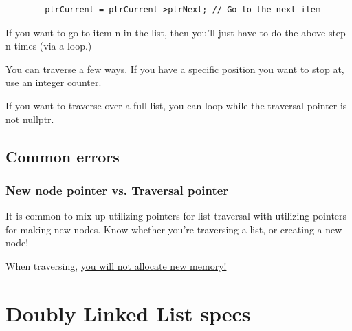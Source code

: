 \documentclass[a4paper,12pt,onepage]{book}
\begin{document}
    \begin{verbatim} 
        ptrCurrent = ptrCurrent->ptrNext; // Go to the next item
    \end{verbatim} 
        
        If you want to go to item n in the list, then you'll just have to do the above step n times (via a loop.)

        You can traverse a few ways. If you have a specific position you want to stop at, use an integer counter.

        If you want to traverse over a full list, you can loop while the traversal pointer is not nullptr.
        
    \section*{Common errors}
    
        \subsection*{New node pointer vs. Traversal pointer}
    
        It is common to mix up utilizing pointers for list traversal with utilizing pointers for making new nodes. Know whether you're traversing a list, or creating a new node!

        When traversing, \underline{you will not allocate new memory!}

    \chapter*{Doubly Linked List specs}
\end{document}
